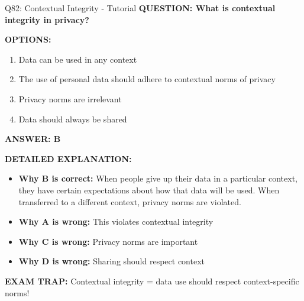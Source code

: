 \documentclass[8pt]{beamer}
\begin{document}
	\begin{frame}{Q82: Contextual Integrity - Tutorial}
		\fontsize{6.5}{7.5}\selectfont
		\textbf{QUESTION: What is contextual integrity in privacy?}
		
		\vspace{0.1cm}
		\textbf{OPTIONS:}
		\begin{enumerate}
			\item Data can be used in any context
			\item The use of personal data should adhere to contextual norms of privacy
			\item Privacy norms are irrelevant
			\item Data should always be shared
		\end{enumerate}
		
		\vspace{0.1cm}
		\textcolor{myblue}{\textbf{ANSWER: B}}
		
		\vspace{0.1cm}
		\textbf{DETAILED EXPLANATION:}
		\begin{itemize}
			\item \textbf{Why B is correct:} When people give up their data in a particular context, they have certain expectations about how that data will be used. When transferred to a different context, privacy norms are violated.
			\item \textbf{Why A is wrong:} This violates contextual integrity
			\item \textbf{Why C is wrong:} Privacy norms are important
			\item \textbf{Why D is wrong:} Sharing should respect context
		\end{itemize}
		
		\textcolor{myred}{\textbf{EXAM TRAP:}} Contextual integrity = \textcolor{myblue}{data use should respect context-specific norms}!
	\end{frame}
	
\end{document}
